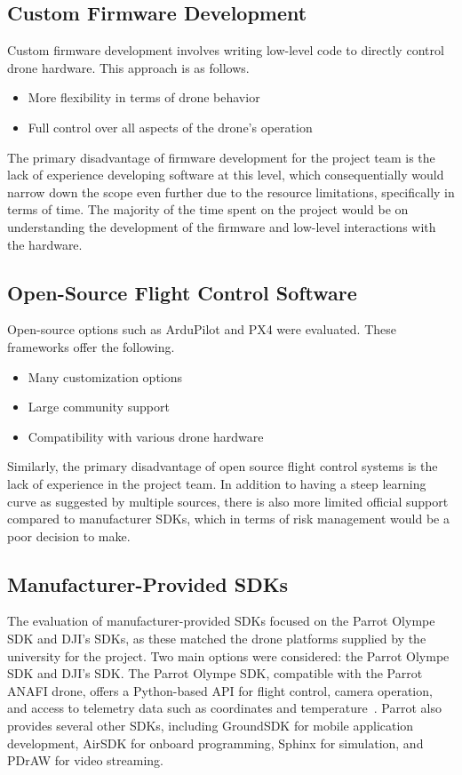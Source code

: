 \subsection{Custom Firmware Development}
Custom firmware development involves writing low-level code to directly control drone hardware. This approach is as follows.

\begin{itemize}
    \item More flexibility in terms of drone behavior
    \item Full control over all aspects of the drone's operation
\end{itemize}

The primary disadvantage of firmware development for the project team is the lack of experience developing software at this level, which consequentially would narrow down the scope even further due to the resource limitations, specifically in terms of time. The majority of the time spent on the project would be on understanding the development of the firmware and low-level interactions with the hardware.

\subsection{Open-Source Flight Control Software}
Open-source options such as ArduPilot and PX4 were evaluated. These frameworks offer the following.

\begin{itemize}
    \item Many customization options
    \item Large community support
    \item Compatibility with various drone hardware
\end{itemize}

Similarly, the primary disadvantage of open source flight control systems is the lack of experience in the project team. In addition to having a steep learning curve as suggested by multiple sources\cite{mdpi_px4_survey,oscarliang_ardupilot,bluefalcon_sdk}, there is also more limited official support compared to manufacturer SDKs, which in terms of risk management would be a poor decision to make.

\subsection{Manufacturer-Provided SDKs}

The evaluation of manufacturer-provided SDKs focused on the Parrot Olympe SDK and DJI's SDKs, as these matched the drone platforms supplied by the university for the project. Two main options were considered: the Parrot Olympe SDK and DJI's SDK. The Parrot Olympe SDK, compatible with the Parrot ANAFI drone, offers a Python-based API for flight control, camera operation, and access to telemetry data such as coordinates and temperature~\cite{ParrotSDKDoc}. Parrot also provides several other SDKs, including GroundSDK for mobile application development, AirSDK for onboard programming, Sphinx for simulation, and PDrAW for video streaming.

